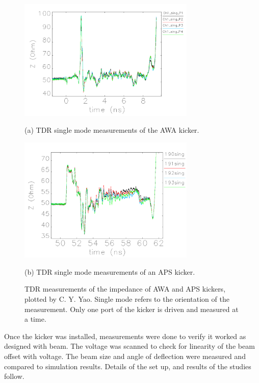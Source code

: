 	\begin{figure}
		\begin{center}
			\includegraphics[width=0.75\textwidth]{./images/TDR_AWA_kicker}
			
			(a) TDR single mode measurements of the AWA kicker.
		\end{center}
		\begin{center}
		\includegraphics[width=0.75\textwidth]{./images/TDR_APS_kicker}
	
		(b) TDR single mode measurements of an APS kicker.
		\caption{TDR measurements of the impedance of AWA and APS kickers, plotted by C. Y. Yao.
		Single mode refers to the orientation of the measurement. 
		Only one port of the kicker is driven and measured at a time. }\label{fig:TDR}		
		\end{center}
	
	\end{figure}



Once the kicker was installed, measurements were done to verify it worked as designed with beam.  
The voltage was scanned to check for linearity of the beam offset with voltage.  
The beam size and angle of deflection were measured and compared to simulation results.  
Details of the set up, and results of the studies follow.

